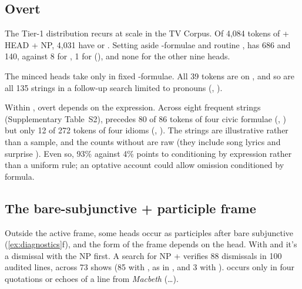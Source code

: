 \documentclass[12pt]{article}
\begin{document}
\subsection{Overt }
\label{sec:god-split}

The Tier-1 distribution recurs at scale in the TV Corpus. Of 4,084 tokens of  + HEAD + NP, 4,031 have  or . Setting aside -formulae and routine ,  has 686 and  140, against 8 for , 1 for  (), and none for the other nine heads.

The minced heads take  only in fixed -formulae. All 39  tokens are on , and so are all 135  strings in a follow-up search limited to pronouns (, ).

Within , overt  depends on the expression. Across eight frequent strings (Supplementary Table~S2),  precedes 80 of 86 tokens of four civic formulae (, ) but only 12 of 272 tokens of four idioms (, ). The strings are illustrative rather than a sample, and the counts without  are raw (they include song lyrics and surprise ). Even so, 93\% against 4\% points to conditioning by expression rather than a uniform rule; an optative account could allow omission conditioned by formula.

\subsection{The bare-subjunctive  + participle frame}
\label{sec:passive}

Outside the active frame, some heads occur as participles after bare subjunctive  (\ref{ex:diagnostics}f), and the form of the frame depends on the head. With  and  it's a dismissal with the NP first. A search for NP +  verifies 88 dismissals in 100 audited lines, across 73 shows (85 with , as in , and 3 with ).  occurs only in four quotations or echoes of a line from \emph{Macbeth} (\dots).
\end{document}
